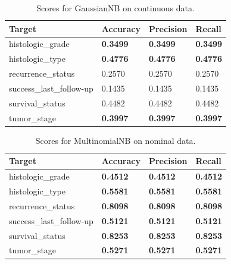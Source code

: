 \documentclass{article}
\begin{document}
\begin{table}[H]
  \begin{center}
  \begin{tabular}{ *{4}{l} }
      \multicolumn{1}{p{1.5cm}}{\raggedright Target} &  
      \multicolumn{1}{p{1.5cm}}{\raggedright Accuracy} &  
      \multicolumn{1}{p{1.5cm}}{\raggedright Precision} &  
      \multicolumn{1}{p{1.5cm}}{\raggedright Recall} \\ \hline
histologic\_grade         &       \textbf{0.3499} &        \textbf{0.3499} &     \textbf{0.3499} \\
histologic\_type          &       \textbf{0.4776} &        \textbf{0.4776} &     \textbf{0.4776} \\
recurrence\_status        &       0.2570 &        0.2570 &     0.2570 \\
success\_last\_follow-up  &       0.1435 &        0.1435 &     0.1435 \\
survival\_status          &       0.4482 &        0.4482 &     0.4482 \\
tumor\_stage              &       \textbf{0.3997} &        \textbf{0.3997} &     \textbf{0.3997} \\
\end{tabular}
\caption{Scores for GaussianNB on continuous data.}
\end{center}
\end{table}

\begin{table}[H]
  \begin{center}
  \begin{tabular}{ *{4}{l} }
      \multicolumn{1}{p{1.5cm}}{\raggedright Target} &  
      \multicolumn{1}{p{1.5cm}}{\raggedright Accuracy} &  
      \multicolumn{1}{p{1.5cm}}{\raggedright Precision} &  
      \multicolumn{1}{p{1.5cm}}{\raggedright Recall} \\ \hline
histologic\_grade        &       \textbf{0.4512} &        \textbf{0.4512} &     \textbf{0.4512} \\
histologic\_type         &       \textbf{0.5581} &        \textbf{0.5581} &     \textbf{0.5581} \\
recurrence\_status       &       \textbf{0.8098} &        \textbf{0.8098} &     \textbf{0.8098} \\
success\_last\_follow-up &       \textbf{0.5121} &        \textbf{0.5121} &     \textbf{0.5121} \\
survival\_status         &       \textbf{0.8253} &        \textbf{0.8253} &     \textbf{0.8253} \\
tumor\_stage             &       \textbf{0.5271} &        \textbf{0.5271} &     \textbf{0.5271} \\
\end{tabular}
\caption{Scores for MultinomialNB on nominal data.}
\end{center}
\end{table}
\end{document}
